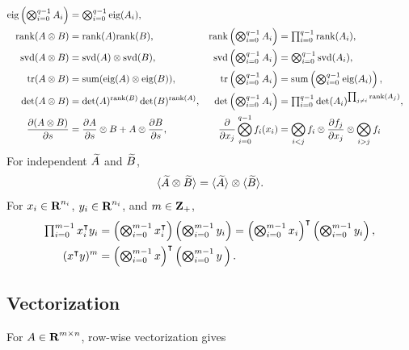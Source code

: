 \documentclass{article}
\begin{document}
\begin{align*}
            \text{eig}\left(\textstyle\bigotimes_{i=0}^{q-1} A_i\right)
            &=\textstyle\bigotimes_{i=0}^{q-1} \text{eig}(A_i),\\
        \text{rank}(A\otimes B) & = \text{rank}(A)\text{rank}(B),&    
            \text{rank}\left(\textstyle\bigotimes_{i=0}^{q-1} A_i\right)
            &=\textstyle\prod_{i=0}^{q-1} \text{rank}(A_i),\\
        \text{svd}(A\otimes B) & = \text{svd}(A)\otimes\text{svd}(B),&    
            \text{svd}\left(\textstyle\bigotimes_{i=0}^{q-1} A_i\right)
            &=\textstyle\bigotimes_{i=0}^{q-1} \text{svd}(A_i),\\
        \text{tr}(A\otimes B)&=\text{sum} (\text{eig}(A)\otimes\text{eig}(B)),&    
            \text{tr}\left(\textstyle\bigotimes_{i=0}^{q-1} A_i\right)
            &=\text{sum}\left(\textstyle\bigotimes_{i=0}^{q-1} \text{eig}(A_i)\right),\\
        \det(A\otimes B)&=\det(A)^{\text{rank}(B)}\det(B)^{\text{rank}(A)},
            &\det\left(\textstyle\bigotimes_{i=0}^{q-1} A_i\right)
            &=\textstyle\prod_{i=0}^{q-1} \det(A_i)^{\prod_{j\neq i}\text{rank}(A_j)},\\
        \frac{\partial (A\otimes B)}{\partial s}&=\frac{\partial A}{\partial s}\otimes B + A\otimes \frac{\partial B}{\partial s},&
        \frac{\partial }{\partial x_j}\bigotimes_{i=0}^{q-1} f_i(x_i)&=\bigotimes_{i<j} f_i
        \otimes
        \frac{\partial f_j}{\partial x_j}
        \otimes 
        \bigotimes_{i>j} f_i
    \end{align*}
    For independent $\widetilde{A}$ and $\widetilde{B}$,
    \begin{align*}
        \langle\widetilde{A}\otimes\widetilde{B}\rangle = \langle\widetilde{A}\rangle\otimes\langle\widetilde{B}\rangle.
    \end{align*}
    For $x_i\in\textbf{R}^{n_i}$, $y_i\in\textbf{R}^{n_i}$, and $m\in\textbf{Z}_+$,
    \begin{align*}
        \textstyle\prod_{i=0}^{m-1} x_i^\intercal y_i 
        &=  \left(\textstyle\bigotimes_{i=0}^{m-1} x_i^\intercal\right)\left(\textstyle\bigotimes_{i=0}^{m-1} y_i\right)
= \left(\textstyle\bigotimes_{i=0}^{m-1} x_i\right)^\intercal\left(\textstyle\bigotimes_{i=0}^{m-1} y_i\right),\\
(x^\intercal y)^m &= \left(\textstyle\bigotimes_{i=0}^{m-1} x\right)^\intercal\left(\textstyle\bigotimes_{i=0}^{m-1} y_{\:}\right).
    \end{align*}

\subsection{Vectorization}

    For $A\in\textbf{R}^{m\times n}$, row-wise vectorization gives
\end{document}

